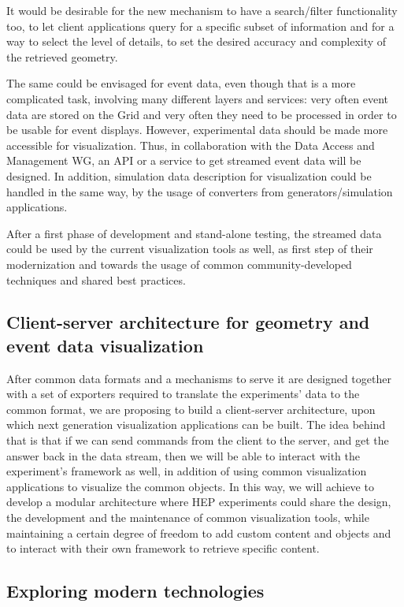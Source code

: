 \documentclass[12pt,a4paper]{article}
\begin{document}
It would be desirable for the new mechanism to have a search/filter functionality too, to let client applications query for a specific
subset of information and for a way to select the level of details, to set the desired accuracy and complexity of the retrieved geometry.

The same could be envisaged for event data, even though that is a more complicated task, involving many different layers and services:
very often event data are stored on the Grid and very often they need to be processed in order to be usable for event displays.
However, experimental data should be made more accessible for visualization. Thus, in collaboration with
the Data Access and Management WG, an API or a service to get streamed event data will be designed.
In addition, simulation data description for visualization could be handled in the same way, by the usage of converters from
generators/simulation applications.

After a first phase of development and stand-alone testing, the streamed data could be used by the current visualization tools as well,
as first step of their modernization and towards the usage of common community-developed techniques and shared best practices.

\hypertarget{client-server}{%
\subsection{Client-server architecture for geometry and event data visualization}\label{client-server}}

After common data formats and a mechanisms to serve it are designed together with a set of exporters required to translate the experiments’
data to the common format, we are proposing to build a client-server architecture, upon which next generation visualization applications can be built.
The idea behind that is that if we can send commands from the client to the server, and get the answer back in the data stream, then
we will be able to interact with the experiment’s framework as well, in addition of using common visualization applications to visualize
the common objects. In this way, we will achieve to develop a modular architecture where HEP experiments could share the design, the
development and the maintenance of common visualization tools, while maintaining a certain degree of freedom to add custom content
and objects and to interact with their own framework to retrieve specific content.

\hypertarget{modern-tech}{%
\subsection{Exploring modern technologies}\label{modern-tech}}
\end{document}

